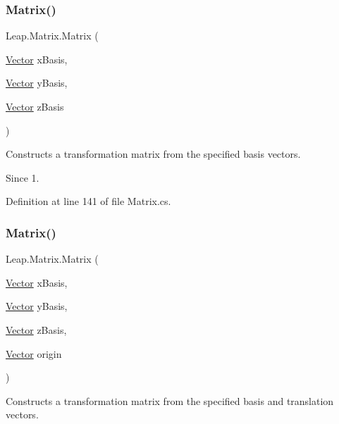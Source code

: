 \subsubsection{\texorpdfstring{Matrix()}{Matrix()}\hspace{0.1cm}{\footnotesize\ttfamily [2/7]}}
{\footnotesize\ttfamily Leap.\+Matrix.\+Matrix (\begin{DoxyParamCaption}\item[{\mbox{\hyperlink{struct_leap_1_1_vector}{Vector}}}]{x\+Basis,  }\item[{\mbox{\hyperlink{struct_leap_1_1_vector}{Vector}}}]{y\+Basis,  }\item[{\mbox{\hyperlink{struct_leap_1_1_vector}{Vector}}}]{z\+Basis }\end{DoxyParamCaption})}



Constructs a transformation matrix from the specified basis vectors. 

\begin{DoxySince}{Since}
1. 
\end{DoxySince}


Definition at line 141 of file Matrix.\+cs.

\mbox{\label{struct_leap_1_1_matrix_a803a35361c96dfbf8c8116b070b0c404}} 
\subsubsection{\texorpdfstring{Matrix()}{Matrix()}\hspace{0.1cm}{\footnotesize\ttfamily [3/7]}}
{\footnotesize\ttfamily Leap.\+Matrix.\+Matrix (\begin{DoxyParamCaption}\item[{\mbox{\hyperlink{struct_leap_1_1_vector}{Vector}}}]{x\+Basis,  }\item[{\mbox{\hyperlink{struct_leap_1_1_vector}{Vector}}}]{y\+Basis,  }\item[{\mbox{\hyperlink{struct_leap_1_1_vector}{Vector}}}]{z\+Basis,  }\item[{\mbox{\hyperlink{struct_leap_1_1_vector}{Vector}}}]{origin }\end{DoxyParamCaption})}



Constructs a transformation matrix from the specified basis and translation vectors. 

